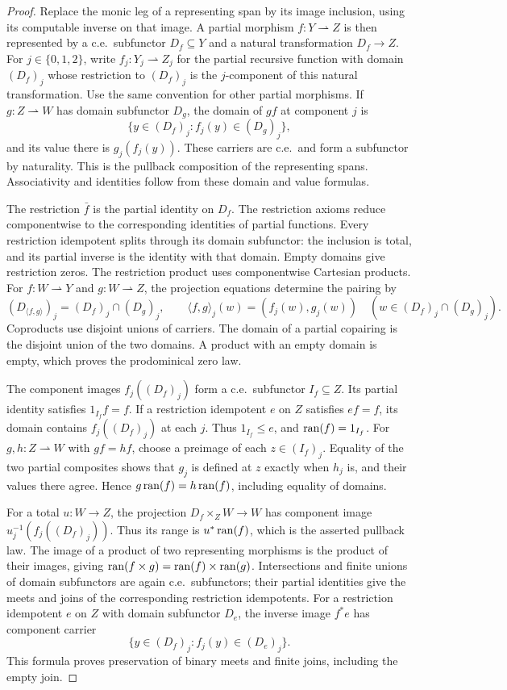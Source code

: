 \begin{proof}
Replace the monic leg of a representing span by its image
inclusion, using its computable inverse on that image. A partial
morphism $f:Y\rightharpoonup Z$ is then represented by a c.e.\ subfunctor
$D_f\subseteq Y$ and a natural transformation $D_f\to Z$.
For $j\in\{0,1,2\}$, write $f_j:Y_j\rightharpoonup Z_j$ for the
partial recursive function with domain $(D_f)_j$ whose restriction
to $(D_f)_j$ is the $j$-component of this natural transformation.
Use the same convention for other partial morphisms.
If $g:Z\rightharpoonup W$ has domain subfunctor $D_g$, the domain of $gf$
at component $j$ is
\[
 \{y\in(D_f)_j:f_j(y)\in(D_g)_j\},
\]
and its value there is $g_j(f_j(y))$. These carriers are c.e.\
and form a subfunctor by naturality. This is the
pullback composition of the representing spans. Associativity
and identities follow from these domain and value formulas.

The restriction $\bar f$ is the partial identity on $D_f$.
The restriction axioms reduce componentwise to the corresponding
identities of partial functions. Every restriction idempotent
splits through its domain subfunctor: the inclusion is total,
and its partial inverse is the identity with that domain.
Empty domains give restriction zeros. The restriction product
uses componentwise Cartesian products. For $f:W\rightharpoonup Y$
and $g:W\rightharpoonup Z$, the projection equations determine the pairing by
\[
 (D_{\langle f,g\rangle})_j=(D_f)_j\cap(D_g)_j,\qquad
 \langle f,g\rangle_j(w)=(f_j(w),g_j(w))
 \quad(w\in (D_f)_j\cap(D_g)_j).
\]
Coproducts use disjoint unions of carriers. The domain of a partial copairing is
the disjoint union of the two domains. A product with an empty domain
is empty, which proves the prodominical zero law.

The component images $f_j((D_f)_j)$ form a c.e.\ subfunctor
$I_f\subseteq Z$. Its partial identity satisfies $1_{I_f}f=f$.
If a restriction idempotent $e$ on $Z$ satisfies $ef=f$, its domain
contains $f_j((D_f)_j)$ at each $j$. Thus $1_{I_f}\leq e$, and
$\operatorname{ran}(f)=1_{I_f}$. For $g,h:Z\rightharpoonup W$ with
$gf=hf$, choose a preimage of each $z\in(I_f)_j$. Equality of the two partial composites shows
that $g_j$ is defined at $z$ exactly when $h_j$ is, and their
values there agree. Hence $g\operatorname{ran}(f)=h\operatorname{ran}(f)$, including
equality of domains.

For a total $u:W\to Z$, the projection
$D_f\times_Z W\to W$ has component image
$u_j^{-1}(f_j((D_f)_j))$. Thus its range is $u^*\operatorname{ran}(f)$,
which is the asserted pullback law. The image of a product
of two representing morphisms is the product of their images, giving
$\operatorname{ran}(f\times g)=\operatorname{ran}(f)\times\operatorname{ran}(g)$.
Intersections and finite unions of domain subfunctors are again
c.e.\ subfunctors; their partial identities give the meets and joins
of the corresponding restriction idempotents. For a restriction idempotent
$e$ on $Z$ with domain subfunctor $D_e$, the inverse image $f^*e$
has component carrier
\[
 \{y\in(D_f)_j:f_j(y)\in(D_e)_j\}.
\]
This formula proves preservation of binary meets and finite joins,
including the empty join.


\end{proof}

